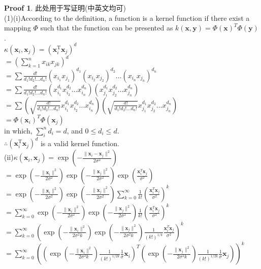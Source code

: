 \documentclass[a4paper,UTF8]{article}
\numberwithin{equation}{section}
\theoremstyle{definition}
\newtheorem*{prove}{Proof}
\begin{document}
\begin{prove}
此处用于写证明(中英文均可)\\
(1)(i)According to the definition, a function is a kernel function if there exist a mapping $\Phi$ such that the function can be presented as $ k(\mathbf x, \mathbf y) =\Phi(\mathbf x)^T \Phi(\mathbf y)$.\\
$\kappa(\mathbf{x}_i,\mathbf{x}_j) = (\mathbf{x}_i^\mathrm{T}\mathbf{x}_j)^d$\\
$= (\sum_{k=1}^n x_{ik}x_{jk})^d$\\
$= \sum \frac{d!}{d_1!d_2!...d_n!}(x_{i_1}x_{j_1})^{d_1} (x_{i_2}x_{j_2})^{d_2} ... (x_{i_n}x_{j_n})^{d_n}$\\
$= \sum \frac{d!}{d_1!d_2!...d_n!}(x_{i_1}^{d_1} x_{i_2}^{d_2} ... x_{i_n}^{d_n})(x_{j_1}^{d_1} x_{j_2}^{d_2} ... x_{j_n}^{d_n})$\\
$= \sum (\sqrt{\frac{d!}{d_1!d_2!...d_n!}} x_{i_1}^{d_1} x_{i_2}^{d_2} ... x_{i_n}^{d_n})(\sqrt{\frac{d!}{d_1!d_2!...d_n!}} x_{j_1}^{d_1} x_{j_2}^{d_2} ... x_{j_n}^{d_n})$\\
$= \Phi(\mathbf x_i)^T \Phi(\mathbf x_j)$\\
in which, $\sum_i^n d_i = d$, and $0 \leq d_i \leq d$.\\
$\therefore (\mathbf{x}_i^\mathrm{T}\mathbf{x}_j)^d$   is a valid kernel function.\\
(ii)$\kappa(\mathbf{x}_i,\mathbf{x}_j) = \exp(-\frac{\lVert \mathbf{x}_i - \mathbf{x}_j \rVert^2}{2\sigma^2})$\\
$= \exp(-\frac{\lVert \mathbf{x}_i \rVert^2}{2\sigma^2})\exp(-\frac{\lVert \mathbf{x}_j \rVert^2}{2\sigma^2})\exp(\frac{\mathbf{x}_i^T \mathbf{x}_j}{\sigma^2})$\\
$= \exp(-\frac{\lVert \mathbf{x}_i \rVert^2}{2\sigma^2})\exp(-\frac{\lVert \mathbf{x}_j \rVert^2}{2\sigma^2})  \sum_{k=0}^{\infty}\frac{1}{k!}(\frac{\mathbf{x}_i^T\mathbf{x}_j}{\sigma^2})^k$\\
$= \sum_{k=0}^{\infty} \exp(-\frac{\lVert \mathbf{x}_i \rVert^2}{2\sigma^2})\exp(-\frac{\lVert \mathbf{x}_j \rVert^2}{2\sigma^2}) \frac{1}{k!}(\frac{\mathbf{x}_i^T\mathbf{x}_j}{\sigma^2})^k$\\
$= \sum_{k=0}^{\infty} (\exp(-\frac{\lVert \mathbf{x}_i \rVert^2}{2\sigma^2 k})  \exp(-\frac{\lVert \mathbf{x}_j \rVert^2}{2\sigma^2 k })  \frac{1}{(k!)^{1/k}} \frac{\mathbf{x}_i^T\mathbf{x}_j}{\sigma^2})^k $\\
$= \sum_{k=0}^{\infty}  ( ( \exp(-\frac{\lVert \mathbf{x}_i \rVert^2}{2\sigma^2 k}) \frac{1}{(k!)^{1/2k}} \frac{1}{\sigma} \mathbf{x}_i )^T ( \exp(-\frac{\lVert \mathbf{x}_j \rVert^2}{2\sigma^2 k }) \frac{1}{(k!)^{1/2k}} \frac{1}{\sigma} \mathbf{x}_j) )^k $\\

\end{prove}
\end{document}
